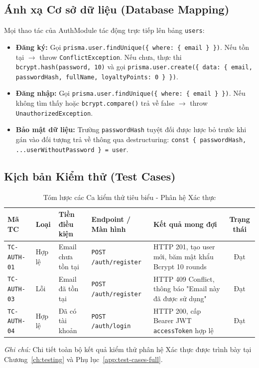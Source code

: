 \documentclass[12pt,a4paper,oneside]{report}
\begin{document}
\subsection{Ánh xạ Cơ sở dữ liệu (Database Mapping)}
Mọi thao tác của AuthModule tác động trực tiếp lên bảng \texttt{users}:
\begin{itemize}
    \item \textbf{Đăng ký:} Gọi \texttt{prisma.user.findUnique(\{ where: \{ email \} \})}. Nếu tồn tại \(\to\) throw \texttt{ConflictException}. Nếu chưa, thực thi \texttt{bcrypt.hash(password, 10)} và gọi \texttt{prisma.user.create(\{ data: \{ email, passwordHash, fullName, loyaltyPoints: 0 \} \})}.
    \item \textbf{Đăng nhập:} Gọi \texttt{prisma.user.findUnique(\{ where: \{ email \} \})}. Nếu không tìm thấy hoặc \texttt{bcrypt.compare()} trả về false \(\to\) throw \texttt{UnauthorizedException}.
    \item \textbf{Bảo mật dữ liệu:} Trường \texttt{passwordHash} tuyệt đối được lược bỏ trước khi gán vào đối tượng trả về thông qua destructuring: \texttt{const \{ passwordHash, ...userWithoutPassword \} = user}.
\end{itemize}

\subsection{Kịch bản Kiểm thử (Test Cases)}
\begin{table}[H]
\centering
\small
\caption{Tóm lược các Ca kiểm thử tiêu biểu - Phân hệ Xác thực}
\label{tab:tc-auth}
\begin{tabularx}{\textwidth}{llp{2.6cm}p{3cm}Xc}
\toprule
\textbf{Mã TC} & \textbf{Loại} & \textbf{Tiền điều kiện} & \textbf{Endpoint / Màn hình} & \textbf{Kết quả mong đợi} & \textbf{Trạng thái} \\
\midrule
\texttt{TC-AUTH-01} & Hợp lệ & Email chưa tồn tại & \texttt{POST /auth/register} & HTTP 201, tạo user mới, băm mật khẩu Bcrypt 10 rounds & Đạt \\
\texttt{TC-AUTH-03} & Lỗi & Email đã tồn tại & \texttt{POST /auth/register} & HTTP 409 Conflict, thông báo "Email này đã được sử dụng" & Đạt \\
\texttt{TC-AUTH-04} & Hợp lệ & Đã có tài khoản & \texttt{POST /auth/login} & HTTP 200, cấp Bearer JWT \texttt{accessToken} hợp lệ & Đạt \\
\bottomrule
\end{tabularx}
\end{table}
\noindent\textit{Ghi chú:} Chi tiết toàn bộ kết quả kiểm thử phân hệ Xác thực được trình bày tại Chương~\ref{ch:testing} và Phụ lục~\ref{app:test-cases-full}.
\end{document}
